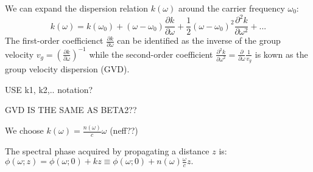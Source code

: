 \documentclass[a4paper]{jpconf}
\begin{document}
We can expand the dispersion relation $k(\omega)$ around the carrier frequency $\omega_0$:
\begin{equation}
k(\omega) = k(\omega_0) + (\omega - \omega_0) \frac{\partial k}{\partial \omega} + \frac{1}{2} (\omega-\omega_0)^2 \frac{\partial^2 k}{\partial \omega^2} + ...
\end{equation}
The first-order coefficienct $\frac{\partial k}{\partial \omega}$ can be identified as the inverse of the group velocity $v_g = \left( \frac{\partial k}{\partial \omega} \right)^{-1}$ while the second-order coefficient $\frac{\partial^2 k}{\partial \omega^2} = \frac{\partial}{\partial \omega} \frac{1}{v_g}$ is kown as the group velocity dispersion (GVD). 

USE k1, k2,.. notation?

GVD IS THE SAME AS BETA2??


We choose $k(\omega) = \frac{n(\omega)}{c} \omega$ (neff??)

The spectral phase acquired by propagating a distance $z$ is: $\phi(\omega; z) = \phi(\omega; 0)+ k z \equiv \phi(\omega; 0) + n(\omega) \frac{\omega}{c}z. $
\end{document}

